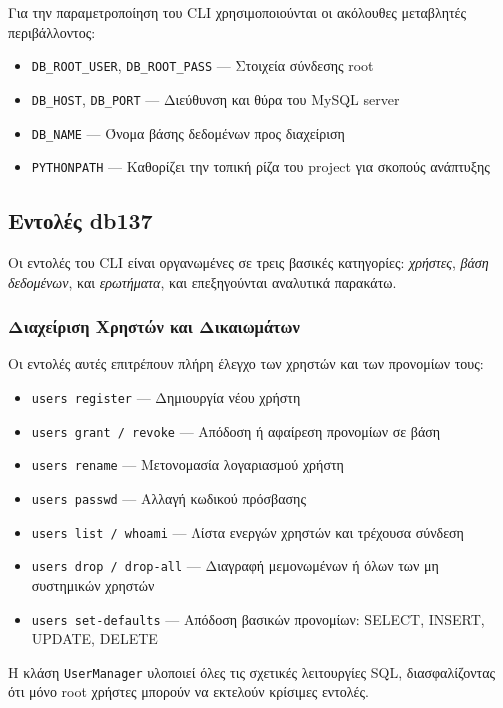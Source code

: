 \documentclass[13pt]{extarticle}
\begin{document}
Για την παραμετροποίηση του CLI χρησιμοποιούνται οι ακόλουθες μεταβλητές περιβάλλοντος:

\begin{itemize}
  \item \texttt{DB\_ROOT\_USER}, \texttt{DB\_ROOT\_PASS} — Στοιχεία σύνδεσης root
  \item \texttt{DB\_HOST}, \texttt{DB\_PORT} — Διεύθυνση και θύρα του MySQL server
  \item \texttt{DB\_NAME} — Όνομα βάσης δεδομένων προς διαχείριση
  \item \texttt{PYTHONPATH} — Καθορίζει την τοπική ρίζα του project για σκοπούς ανάπτυξης
\end{itemize}

\subsection{Εντολές db137}

Οι εντολές του CLI είναι οργανωμένες σε τρεις βασικές κατηγορίες: \textit{χρήστες}, \textit{βάση δεδομένων}, και \textit{ερωτήματα}, και επεξηγούνται αναλυτικά παρακάτω.

\subsubsection{Διαχείριση Χρηστών και Δικαιωμάτων}

Οι εντολές αυτές επιτρέπουν πλήρη έλεγχο των χρηστών και των προνομίων τους:
\begin{itemize}
  \item \texttt{users register} — Δημιουργία νέου χρήστη
  \item \texttt{users grant / revoke} — Απόδοση ή αφαίρεση προνομίων σε βάση
  \item \texttt{users rename} — Μετονομασία λογαριασμού χρήστη
  \item \texttt{users passwd} — Αλλαγή κωδικού πρόσβασης
  \item \texttt{users list / whoami} — Λίστα ενεργών χρηστών και τρέχουσα σύνδεση
  \item \texttt{users drop / drop-all} — Διαγραφή μεμονωμένων ή όλων των μη συστημικών χρηστών
  \item \texttt{users set-defaults} — Απόδοση βασικών προνομίων: SELECT, INSERT, UPDATE, DELETE
\end{itemize}
Η κλάση \texttt{UserManager} υλοποιεί όλες τις σχετικές λειτουργίες SQL, διασφαλίζοντας ότι μόνο root χρήστες μπορούν να εκτελούν κρίσιμες εντολές.
\end{document}
